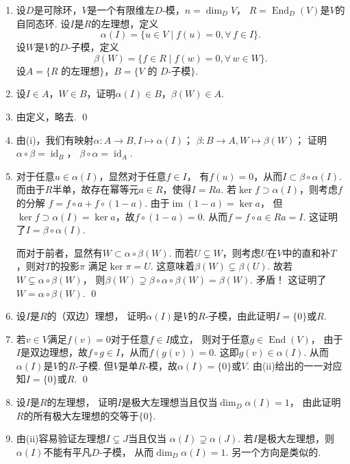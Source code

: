 \begin{enumerate}
        \item[8.3] 设$D$是可除环，$V$是一个有限维左$D$-模，$n = \dim_{D}V$，
        $R = \operatorname{End}_{D}(V)$是$V$的自同态环.
        设$I$是$R$的左理想，定义
        \[\alpha(I) = \{u \in V \mid f(u) = 0,\forall \, f \in I\}.\]
        设$W$是$V$的$D$-子模，定义
        \[\beta(W) = \{f \in R \mid f(w)=0,\forall \, w \in W\}.\]
        设$A = \{R\text{ 的左理想}\}$，$B=\{V\text{ 的 }D\text{-子模}\}$.
        \item[(i)]
            设$I \in A$，$W \in B$，证明$\alpha(I) \in B$，$\beta(W) \in A$.
        \item[\textbf{证明:}]
            由定义，略去. \qed
        \item[(ii)]
            由(i)，我们有映射$\alpha:A \rightarrow B, I \mapsto \alpha(I)$；
            $\beta:B \rightarrow A, W \mapsto \beta(W)$；
            证明$\alpha \circ \beta = \operatorname{id}_{B}$，
            $\beta \circ \alpha = \operatorname{id}_{A}$.
        \item[\textbf{证明:}]
            对于任意$u \in \alpha(I)$，显然对于任意$f \in I$，
            有$f(u) = 0$，从而$I \subset \beta \circ \alpha(I)$.
            而由于$R$半单，故存在幂等元$a \in R$，使得$I = Ra$.
            若$\ker f \supset \alpha(I)$，则考虑$f$的分解
            $f = f \circ a + f \circ (1 - a)$.
            由于$\operatorname{im}(1-a) = \ker a$，
            但$\ker f \supset \alpha(I) = \ker a$，故$f \circ (1-a) = 0$.
            从而$f = f \circ a \in Ra = I$. 这证明了$I = \beta \circ \alpha(I)$. 
            
            而对于前者，显然有$W \subset \alpha \circ \beta(W)$.
            而若$U \subsetneq W$，则考虑$U$在$V$中的直和补$T$，则对$T$的投影$\pi$
            满足$\ker \pi = U$. 这意味着$\beta(W) \subsetneq \beta(U)$.
            故若$W \subsetneq \alpha \circ \beta(W)$，
            则$\beta(W) \supsetneq \beta \circ \alpha \circ \beta(W) = \beta(W)$. 矛盾！
            这证明了$W = \alpha \circ \beta(W)$. \qed
        \item[(iii)] 设$I$是$R$的（双边）理想，
            证明$\alpha(I)$是$V$的$R$-子模，由此证明$I = \{0\}$或$R$.
        \item[\textbf{证明:}]
            若$v \in V$满足$f(v) = 0$对于任意$f \in I$成立，
            则对于任意$g \in \operatorname{End}(V)$，
            由于$I$是双边理想，故$f \circ g \in I$，从而$f(g(v)) = 0$.
            这即$g(v) \in \alpha(I)$. 从而$\alpha(I)$是$V$的$R$-子模.
            但$V$是单$R$-模，故$\alpha(I) = \{0\}$或$V$.
            由(ii)给出的一一对应知$I = \{0\}$或$R$. \qed
        \item[(iv)] 设$I$是$R$的左理想，
            证明$I$是极大左理想当且仅当$\dim_{D}\alpha(I) = 1$，
            由此证明$R$的所有极大左理想的交等于$\{0\}$.
        \item[\textbf{证明:}]
            由(ii)容易验证左理想$I \subsetneq J$当且仅当
            $\alpha(I) \supsetneq \alpha(J)$.
            若$I$是极大左理想，则$\alpha(I)$不能有平凡$D$-子模，
            从而$\dim_{D}\alpha(I) = 1$.
            另一个方向是类似的.


\end{enumerate}
